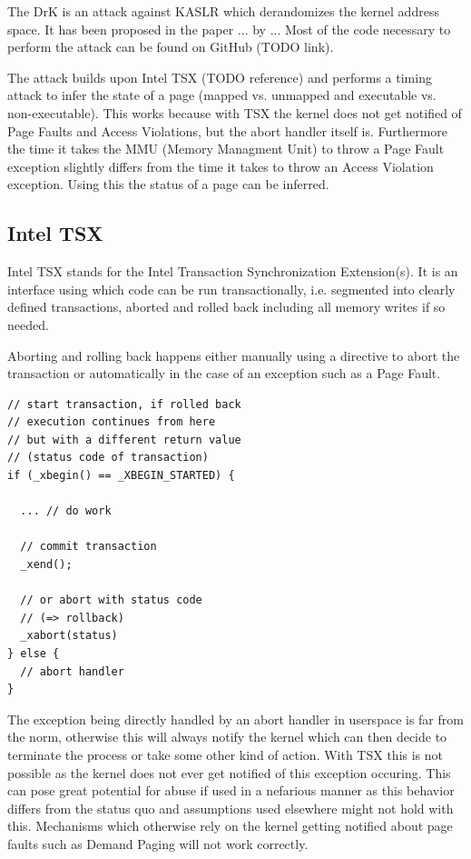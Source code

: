 The DrK is an attack against KASLR which derandomizes the kernel address space.
It has been proposed in the paper ... by ...
Most of the code necessary to perform the attack can be found on GitHub (TODO link).

The attack builds upon Intel TSX (TODO reference) and performs a timing attack to infer the state of a page (mapped vs. unmapped and executable vs. non-executable).
This works because with TSX the kernel does not get notified of Page Faults and Access Violations, but the abort handler itself is.
Furthermore the time it takes the MMU (Memory Managment Unit) to throw a Page Fault exception slightly differs from the time it takes to throw an Access Violation exception.
Using this the status of a page can be inferred.

\subsection{Intel TSX}

Intel TSX stands for the Intel Transaction Synchronization Extension(s).
It is an interface using which code can be run transactionally, i.e. segmented into clearly defined transactions, aborted and rolled back including all memory writes if so needed.

Aborting and rolling back happens either manually using a directive to abort the transaction or automatically in the case of an exception such as a Page Fault.

\begin{lstlisting}
// start transaction, if rolled back
// execution continues from here
// but with a different return value
// (status code of transaction)
if (_xbegin() == _XBEGIN_STARTED) {

  ... // do work

  // commit transaction
  _xend();

  // or abort with status code
  // (=> rollback)
  _xabort(status)
} else {
  // abort handler
}
\end{lstlisting}

The exception being directly handled by an abort handler in userspace is far from the norm, otherwise this will always notify the kernel which can then decide to terminate the process or take some other kind of action.
With TSX this is not possible as the kernel does not ever get notified of this exception occuring.
This can pose great potential for abuse if used in a nefarious manner as this behavior differs from the status quo and assumptions used elsewhere might not hold with this.
Mechanisms which otherwise rely on the kernel getting notified about page faults such as Demand Paging will not work correctly.

